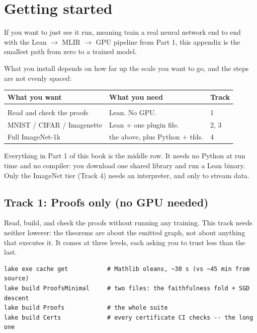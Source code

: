 \chapter{Getting started}
\label{app:getting_started}

If you want to just see it run, meaning train a real neural network end to
end with the Lean $\to$ MLIR $\to$ GPU pipeline from Part 1, this appendix is
the smallest path from zero to a trained model.

What you install depends on how far up the scale you want to go, and the
steps are not evenly spaced:

\begin{center}
\begin{tabular}{@{}lll@{}}
\textbf{What you want} & \textbf{What you need} & \textbf{Track} \\[2pt]
\hline \\[-6pt]
Read and check the proofs      & Lean. No GPU.                    & 1 \\
MNIST / CIFAR / Imagenette     & Lean + one plugin file.          & 2, 3 \\
Full ImageNet-1k               & the above, plus Python + tfds.   & 4 \\
\end{tabular}
\end{center}

Everything in Part 1 of this book is the middle row. It needs no Python at
run time and no compiler: you download one shared library and run a Lean
binary. Only the ImageNet tier (Track 4) needs an interpreter, and only to
stream data.

\section*{Track 1: Proofs only (no GPU needed)}

Read, build, and check the proofs without running any training. This track
needs neither lowerer: the theorems are about the emitted graph, not about
anything that executes it. It comes at three levels, each asking you to trust
less than the last.


\begin{verbatim}
lake exe cache get           # Mathlib oleans, ~30 s (vs ~45 min from source)
lake build ProofsMinimal     # two files: the faithfulness fold + SGD descent
lake build Proofs            # the whole suite
lake build Certs             # every certificate CI checks -- the long one
\end{verbatim}

